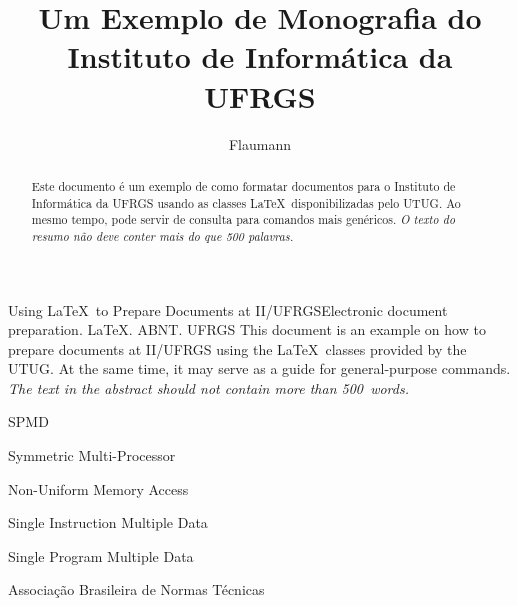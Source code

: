 \documentclass[ecp,tc]{iiufrgs}
\title{Um Exemplo de Monografia do Instituto de Informática da UFRGS}
\author{Flaumann}{Fritz Gutenberg}
\begin{document}
\maketitle





\begin{abstract}
    Este documento é um exemplo de como formatar documentos para o
    Instituto de Informática da UFRGS usando as classes \LaTeX\
    disponibilizadas pelo UTUG\@. Ao mesmo tempo, pode servir de consulta
    para comandos mais genéricos. \emph{O texto do resumo não deve
      conter mais do que 500 palavras.}
\end{abstract}

\begin{englishabstract}{Using \LaTeX\ to Prepare Documents at II/UFRGS}{Electronic document preparation. \LaTeX. ABNT. UFRGS}
    This document is an example on how to prepare documents at II/UFRGS
    using the \LaTeX\ classes provided by the UTUG\@. At the same time, it
    may serve as a guide for general-purpose commands. \emph{The text in
      the abstract should not contain more than 500~words.}
\end{englishabstract}

\listoffigures

\listoftables

\begin{listofabbrv}{SPMD}
    \item[SMP] Symmetric Multi-Processor
    \item[NUMA] Non-Uniform Memory Access
    \item[SIMD] Single Instruction Multiple Data
    \item[SPMD] Single Program Multiple Data
    \item[ABNT] Associação Brasileira de Normas Técnicas
\end{listofabbrv}
\end{document}
